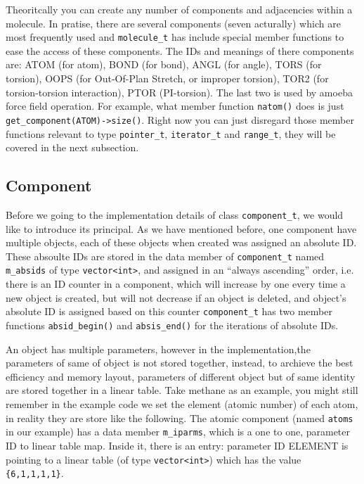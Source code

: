 \documentclass[letterpaper]{book}
\begin{document}
Theoritcally you can create any number of components and adjacencies within a molecule. In pratise,
there are several components (seven acturally) which are most frequently used and \lstinline$molecule_t$
has include special member functions to ease the access of these components. The IDs and meanings of
there components are: ATOM (for atom), BOND (for bond), ANGL (for angle), TORS (for torsion), OOPS (for 
Out-Of-Plan Stretch, or improper torsion), TOR2 (for torsion-torsion interaction), PTOR (PI-torsion).
The last two is used by amoeba force field operation. For example, what member function \lstinline$natom()$
does is just \lstinline$get_component(ATOM)->size()$. Right now you can just disregard those member functions
relevant to type \lstinline$pointer_t$, \lstinline$iterator_t$ and \lstinline$range_t$, they will be
covered in the next subsection.

\subsection{Component}
Before we going to the implementation details of class \lstinline$component_t$, we would like to introduce 
its principal. As we have mentioned before, one component have multiple objects, each
of these objects when created was assigned an absolute ID. These absoulte IDs are stored in the data member of
\lstinline$component_t$ named \lstinline$m_absids$ of type \lstinline$vector<int>$, and assigned in an ``always
ascending'' order, i.e. there is an ID counter in a component, which will increase by one every time a new object
is created, but will not decrease if an object is deleted, and object's absolute ID is assigned based on this counter
\lstinline$component_t$ has two member functions \lstinline$absid_begin()$ and \lstinline$absis_end()$ for the 
iterations of absolute IDs. 

An object has multiple parameters, however in the implementation,the parameters of same of object is not stored
together, instead, to archieve the best efficiency and memory
layout, parameters of different object but of same identity are stored together in a linear table. 
Take methane as an example, you might still
remember in the example code we set the element (atomic number) of each atom, in reality they are store like the
following. The atomic component (named \lstinline$atoms$ in our example) has a data member \lstinline$m_iparms$, 
which is a one to one, parameter ID to linear table map. Inside it, there is an entry: parameter ID ELEMENT is 
pointing to a linear table (of type \lstinline$vector<int>$) which has the value \lstinline${6,1,1,1,1}$.
\end{document}
